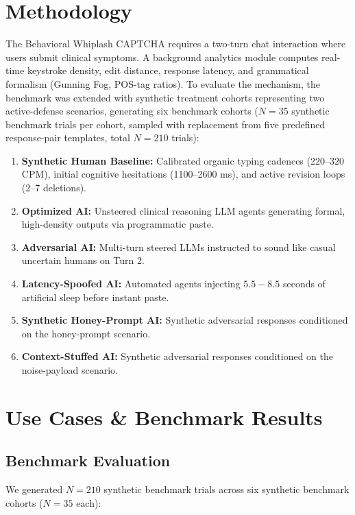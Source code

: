 \documentclass[10pt,a4paper]{article}
\begin{document}
\section*{Methodology}
The Behavioral Whiplash CAPTCHA requires a two-turn chat interaction where users submit clinical symptoms. A background analytics module computes real-time keystroke density, edit distance, response latency, and grammatical formalism (Gunning Fog, POS-tag ratios). To evaluate the mechanism, the benchmark was extended with synthetic treatment cohorts representing two active-defense scenarios, generating six benchmark cohorts ($N=35$ synthetic benchmark trials per cohort, sampled with replacement from five predefined response-pair templates, total $N=210$ trials):
\begin{enumerate}
    \item \textbf{Synthetic Human Baseline:} Calibrated organic typing cadences (220--320 CPM), initial cognitive hesitations (1100--2600 ms), and active revision loops (2--7 deletions).
    \item \textbf{Optimized AI:} Unsteered clinical reasoning LLM agents generating formal, high-density outputs via programmatic paste.
    \item \textbf{Adversarial AI:} Multi-turn steered LLMs instructed to sound like casual uncertain humans on Turn 2.
    \item \textbf{Latency-Spoofed AI:} Automated agents injecting $5.5-8.5$ seconds of artificial sleep before instant paste.
    \item \textbf{Synthetic Honey-Prompt AI:} Synthetic adversarial responses conditioned on the honey-prompt scenario.
    \item \textbf{Context-Stuffed AI:} Synthetic adversarial responses conditioned on the noise-payload scenario.
\end{enumerate}

\section*{Use Cases \& Benchmark Results}

\subsection*{Benchmark Evaluation}
We generated $N=210$ synthetic benchmark trials across six synthetic benchmark cohorts ($N=35$ each):
\end{document}
